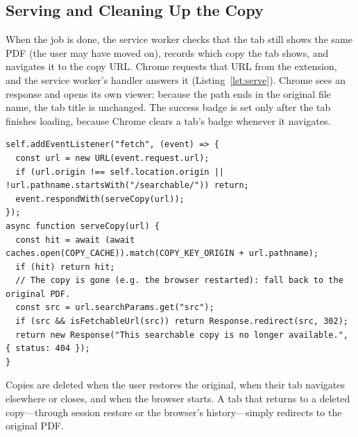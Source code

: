 \subsection{Serving and Cleaning Up the Copy}
When the job is done, the service worker checks that the tab still shows the
same PDF (the user may have moved on), records which copy the tab shows, and
navigates it to the copy URL. Chrome requests that URL from the extension, and
the service worker's  handler answers it (Listing~\ref{lst:serve}).
Chrome sees an  response and opens its own viewer; because
the path ends in the original file name, the tab title is unchanged. The success
badge is set only after the tab finishes loading, because Chrome clears a tab's
badge whenever it navigates.

\begin{lstlisting}[caption={Serving searchable copies at the extension's own URLs. Cache Storage only accepts http(s) keys, so copies are stored under a placeholder origin with the same path (\code{service-worker.js}).}, label={lst:serve}]
self.addEventListener("fetch", (event) => {
  const url = new URL(event.request.url);
  if (url.origin !== self.location.origin || !url.pathname.startsWith("/searchable/")) return;
  event.respondWith(serveCopy(url));
});
async function serveCopy(url) {
  const hit = await (await caches.open(COPY_CACHE)).match(COPY_KEY_ORIGIN + url.pathname);
  if (hit) return hit;
  // The copy is gone (e.g. the browser restarted): fall back to the original PDF.
  const src = url.searchParams.get("src");
  if (src && isFetchableUrl(src)) return Response.redirect(src, 302);
  return new Response("This searchable copy is no longer available.", { status: 404 });
}
\end{lstlisting}

Copies are deleted when the user restores the original, when their tab
navigates elsewhere or closes, and when the browser starts. A tab that returns to
a deleted copy---through session restore or the browser's history---simply
redirects to the original PDF.
